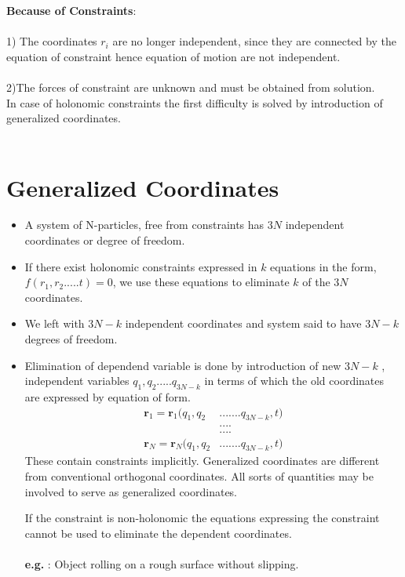 \textbf{Because of Constraints}:\\\\
1) The coordinates $r_i$ are no longer independent, since they are connected by the equation of constraint hence equation of motion are not independent.\\\\
2)The forces of constraint are unknown and must be obtained from solution.\\
In case of holonomic constraints the first difficulty is solved by introduction of generalized coordinates.\\\\
\section{Generalized Coordinates}
\begin{itemize}
	\item A system of N-particles, free from constraints has $3N$ independent coordinates or degree of freedom. 
	\item If there exist holonomic constraints expressed in $k$ equations in the form,  $f(r_1,r_2.....t)=0$, we use these equations to eliminate $k$ of the $3N$ coordinates.
	\item We left with $3N-k$ independent coordinates and system said to have $3N-k$ degrees of freedom.
	\item Elimination of dependend variable is done by introduction of new $3N-k$ , independent variables $q_1,q_2.....q_{3N-k}$ in terms of which the old coordinates are expressed by equation of form.
\begin{align*}
	\textbf{r}_1=\textbf{r}_1(q_1,q_2&.......q_{3N-k}, t)\\
	&....\\
	&....\\
	\textbf{r}_N=\textbf{r}_N(q_1,q_2&.......q_{3N-k}, t)
\end{align*}
	These contain constraints implicitly. Generalized coordinates are different from conventional orthogonal coordinates. All sorts of quantities  may be involved to serve as generalized coordinates.
	\begin{note}
		If the constraint is non-holonomic the equations expressing the constraint cannot be used to eliminate the dependent coordinates.\\\\
		\textbf{e.g. } : Object rolling on a rough surface without slipping.
	\end{note}
	
\end{itemize}
